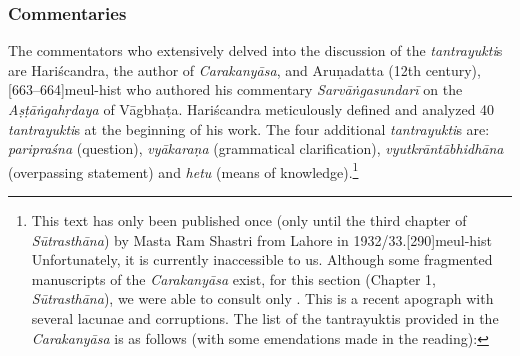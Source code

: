 \subsubsection{Commentaries}\label{commentaries}
The commentators who extensively delved into the discussion of the \emph{tantrayukti}s are Hariścandra, the author of \emph{Carakanyāsa}, and Aruṇadatta (12th century),[663--664]{meul-hist}
who authored his commentary \emph{Sarvāṅgasundarī} on the \emph{Aṣṭāṅgahṛdaya} of Vāgbhaṭa. Hariścandra meticulously defined and analyzed 40 \emph{tantrayukti}s at the beginning of his work. The four additional \emph{tantrayukti}s are:  \emph{paripraśna} (question), \emph{vyākaraṇa} (grammatical clarification), \emph{vyutkrāntābhidhāna} (overpassing statement) and \emph{hetu} (means of knowledge).\footnote{This text has only been published once 
	(only until the third chapter of \emph{Sūtrasthāna}) by Masta Ram Shastri from Lahore in 1932/33.[290]{meul-hist} Unfortunately, it is currently inaccessible to us. Although some fragmented manuscripts of the \emph{Carakanyāsa} exist, for this section (Chapter 1, \emph{Sūtrasthāna}), we were able to consult only . This is a recent apograph with several lacunae and corruptions. The list of the tantrayuktis provided in the \emph{Carakanyāsa} is as follows (with some emendations made in the reading): }

